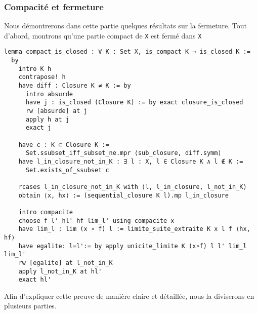 \documentclass[a4paper, 12pt]{article}
\newcommand{\lean}[1]{\texttt{#1}}
\begin{document}
 \vspace{\baselineskip} 
 
\subsubsection{Compacité et fermeture}
Nous démontrerons dans cette partie quelques résultats sur la fermeture. Tout d'abord, montrons qu'une partie compact de \lean{X} est fermé dans \lean{X}

\begin{verbatim}   
lemma compact_is_closed : ∀ K : Set X, is_compact K → is_closed K := 
  by
    intro K h
    contrapose! h
    have diff : Closure K ≠ K := by
      intro absurde
      have j : is_closed (Closure K) := by exact closure_is_closed
      rw [absurde] at j
      apply h at j
      exact j

    have c : K ⊂ Closure K :=
      Set.ssubset_iff_subset_ne.mpr ⟨sub_closure, diff.symm⟩
    have l_in_closure_not_in_K : ∃ l : X, l ∈ Closure K ∧ l ∉ K :=
      Set.exists_of_ssubset c

    rcases l_in_closure_not_in_K with ⟨l, l_in_closure, l_not_in_K⟩
    obtain ⟨x, hx⟩ := (sequential_closure K l).mp l_in_closure

    intro compacite
    choose f l' hl' hf lim_l' using compacite x
    have lim_l : lim (x ∘ f) l := limite_suite_extraite K x l f ⟨hx, hf⟩
    have egalite: l=l':= by apply unicite_limite K (x∘f) l l' lim_l lim_l'
    rw [egalite] at l_not_in_K
    apply l_not_in_K at hl'
    exact hl'
\end{verbatim}

Afin d'expliquer cette preuve de manière claire et détaillée,  nous la diviserons en plusieurs parties.\\
\end{document}
